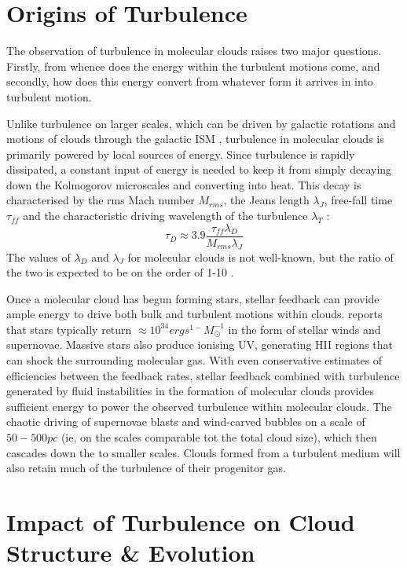 \documentclass[12pt, preprint]{aastex}
\begin{document}
\section{Origins of Turbulence}
The observation of turbulence in molecular clouds raises two major questions.
Firstly, from whence does the energy within the turbulent motions come, and
secondly, how does this energy convert from whatever form it arrives in into 
turbulent motion.

Unlike turbulence on larger scales, which can be driven by galactic rotations
and motions of clouds through the galactic ISM \citep{balb1991}, turbulence in
molecular clouds is primarily powered by local sources of energy.  Since
turbulence is rapidly dissipated, a constant input of energy is needed to keep
it from simply decaying down the Kolmogorov microscales and converting into
heat.  This decay is characterised by the rms Mach number $M_{rms}$, the Jeans
length $\lambda_J$, free-fall time $\tau_{ff}$ and the characteristic driving 
wavelength of the turbulence $\lambda_T$ \citep{mac1999}:
$$ \tau_D \approx 3.9 \frac{\tau_{ff}\lambda_D}{M_{rms}\lambda_J}$$
The values of $\lambda_D$ and $\lambda_J$ for molecular clouds is not
well-known, but the ratio of the two is expected to be on the order of 1-10
\citep{mac2004}.

Once a molecular cloud has begun forming stars, stellar feedback can provide
ample energy to drive both bulk and turbulent motions within clouds.
\citet{agertz2012} reports that stars typically return 
$\approx 10^{34} erg s^{1-} M_\odot^{-1}$ in the form of stellar winds and
supernovae.  Massive stars also produce ionising UV, generating HII regions that
can shock the surrounding molecular gas.  With even conservative estimates of
efficiencies between the feedback rates, stellar feedback combined with
turbulence generated by fluid instabilities in the formation of molecular clouds
provides sufficient energy to power the observed turbulence within molecular
clouds\citep{elm2004}.  The chaotic driving of supernovae blasts and wind-carved
bubbles on a scale of $50-500pc$ (ie, on the scales comparable tot the total
cloud size), which then cascades down the to smaller scales.  Clouds formed from
a turbulent medium will also retain much of the turbulence of their progenitor
gas.
\section{Impact of Turbulence on Cloud Structure \& Evolution}
\end{document}
